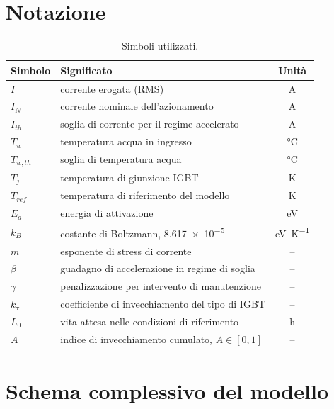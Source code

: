 \documentclass[11pt,a4paper]{article}
\begin{document}
\section{Notazione}

\begin{table}[h]
\centering
\begin{tabular}{llc}
\toprule
Simbolo & Significato & Unità \\
\midrule
$I$            & corrente erogata (RMS)                              & \si{\ampere} \\
$I_N$          & corrente nominale dell'azionamento                  & \si{\ampere} \\
$I_{th}$       & soglia di corrente per il regime accelerato         & \si{\ampere} \\
$T_w$          & temperatura acqua in ingresso                       & \si{\degreeCelsius} \\
$T_{w,th}$     & soglia di temperatura acqua                         & \si{\degreeCelsius} \\
$T_j$          & temperatura di giunzione IGBT                       & \si{\kelvin} \\
$T_{ref}$      & temperatura di riferimento del modello              & \si{\kelvin} \\
$E_a$          & energia di attivazione                              & \si{\electronvolt} \\
$k_B$          & costante di Boltzmann, \num{8.617e-5}               & \si{\electronvolt\per\kelvin} \\
$m$            & esponente di stress di corrente                     & -- \\
$\beta$        & guadagno di accelerazione in regime di soglia       & -- \\
$\gamma$       & penalizzazione per intervento di manutenzione       & -- \\
$k_\tau$       & coefficiente di invecchiamento del tipo di IGBT     & -- \\
$L_0$          & vita attesa nelle condizioni di riferimento         & \si{\hour} \\
$A$            & indice di invecchiamento cumulato, $A\in[0,1]$      & -- \\
\bottomrule
\end{tabular}
\caption{Simboli utilizzati.}
\end{table}

\section{Schema complessivo del modello}
\label{sec:schema}
\end{document}
